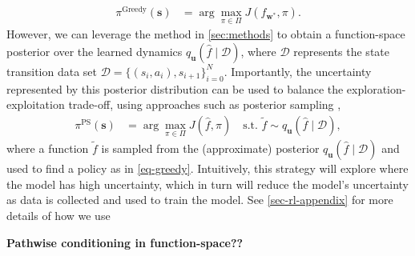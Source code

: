 \documentclass{article}
\newcommand{\state}{\ensuremath{\mathbf{s}}}
\newcommand{\dataset}{\ensuremath{\mathcal{D}}}
\newcommand{\inputDomain}{\ensuremath{\mathbb{R}^{D}}}
\newcommand{\outputDomain}{\ensuremath{\mathbb{R}^{C}}}
\newcommand{\transitionFn}{\ensuremath{f}}
\newcommand{\weights}{\ensuremath{\mathbf{w}}}
\newcommand{\transitionFnWithParams}{\ensuremath{\transitionFn_{\weights}}}
\newcommand{\policy}{\ensuremath{\pi}}
\begin{document}
\begin{align} \label{eq-greedy}
  \policy^{\text{Greedy}}(\state) &= \arg \max_{\pi \in \Pi} J(f_{\mathbf{w}^{*}}, \pi).
\end{align}
However, we can leverage the method in \cref{sec:methods} to obtain a function-space posterior over the learned dynamics $q_{\mathbf{u}}(\hat{\transitionFn} \mid \dataset)$,
where $\mathcal{D}$ represents the state transition data set \(\mathcal{D} = \{(s_{i},a_{i}), s_{i+1}\}_{i=0}^{N}\).
Importantly, the uncertainty represented by this posterior distribution can be used to balance the exploration-exploitation trade-off,
using approaches such as posterior sampling \cite{osbandWhyPosteriorSampling2017,osbandMoreEfficientReinforcement2013},
\begin{align} \label{eq-posterior-sampling}
  \policy^{\text{PS}}(\state) &= \arg \max_{\pi \in \Pi} J(\hat{f}, \pi)
\quad \text{s.t. } \tilde{\transitionFn} \sim q_{\mathbf{u}}(\hat{\transitionFn} \mid \dataset),
\end{align}
where a function $\tilde{\transitionFn}$ is sampled from the (approximate) posterior $q_{\mathbf{u}}(\hat{\transitionFn} \mid \dataset)$ and used to find a policy as
in \cref{eq-greedy}.
Intuitively, this strategy will explore where the model has high uncertainty, which in turn will reduce the model's uncertainty as data is collected and used to
train the model.
See \cref{sec-rl-appendix} for more details of how we use

\textbf{Pathwise conditioning in function-space??}




\end{document}
